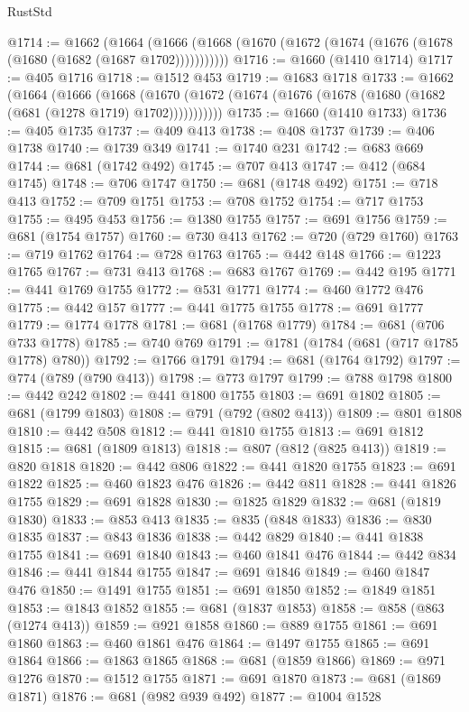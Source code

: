 \begin{lexlean}{RustStd}
\begin{coremodule}
@1714 := @1662
    (@1664 (@1666 (@1668 (@1670 (@1672 (@1674 (@1676 (@1678 (@1680 (@1682 (@1687 @1702)))))))))))
@1716 := @1660 (@1410 @1714)
@1717 := @405 @1716
@1718 := @1512 @453
@1719 := @1683 @1718
@1733 := @1662
    (@1664
      (@1666
        (@1668 (@1670 (@1672 (@1674 (@1676 (@1678 (@1680 (@1682 (@681 (@1278 @1719) @1702)))))))))))
@1735 := @1660 (@1410 @1733)
@1736 := @405 @1735
@1737 := @409 @413
@1738 := @408 @1737
@1739 := @406 @1738
@1740 := @1739 @349
@1741 := @1740 @231
@1742 := @683 @669
@1744 := @681 (@1742 @492)
@1745 := @707 @413
@1747 := @412 (@684 @1745)
@1748 := @706 @1747
@1750 := @681 (@1748 @492)
@1751 := @718 @413
@1752 := @709 @1751
@1753 := @708 @1752
@1754 := @717 @1753
@1755 := @495 @453
@1756 := @1380 @1755
@1757 := @691 @1756
@1759 := @681 (@1754 @1757)
@1760 := @730 @413
@1762 := @720 (@729 @1760)
@1763 := @719 @1762
@1764 := @728 @1763
@1765 := @442 @148
@1766 := @1223 @1765
@1767 := @731 @413
@1768 := @683 @1767
@1769 := @442 @195
@1771 := @441 @1769 @1755
@1772 := @531 @1771
@1774 := @460 @1772 @476
@1775 := @442 @157
@1777 := @441 @1775 @1755
@1778 := @691 @1777
@1779 := @1774 @1778
@1781 := @681 (@1768 @1779)
@1784 := @681 (@706 @733 @1778)
@1785 := @740 @769
@1791 := @1781 (@1784 (@681 (@717 @1785 @1778) @780))
@1792 := @1766 @1791
@1794 := @681 (@1764 @1792)
@1797 := @774 (@789 (@790 @413))
@1798 := @773 @1797
@1799 := @788 @1798
@1800 := @442 @242
@1802 := @441 @1800 @1755
@1803 := @691 @1802
@1805 := @681 (@1799 @1803)
@1808 := @791 (@792 (@802 @413))
@1809 := @801 @1808
@1810 := @442 @508
@1812 := @441 @1810 @1755
@1813 := @691 @1812
@1815 := @681 (@1809 @1813)
@1818 := @807 (@812 (@825 @413))
@1819 := @820 @1818
@1820 := @442 @806
@1822 := @441 @1820 @1755
@1823 := @691 @1822
@1825 := @460 @1823 @476
@1826 := @442 @811
@1828 := @441 @1826 @1755
@1829 := @691 @1828
@1830 := @1825 @1829
@1832 := @681 (@1819 @1830)
@1833 := @853 @413
@1835 := @835 (@848 @1833)
@1836 := @830 @1835
@1837 := @843 @1836
@1838 := @442 @829
@1840 := @441 @1838 @1755
@1841 := @691 @1840
@1843 := @460 @1841 @476
@1844 := @442 @834
@1846 := @441 @1844 @1755
@1847 := @691 @1846
@1849 := @460 @1847 @476
@1850 := @1491 @1755
@1851 := @691 @1850
@1852 := @1849 @1851
@1853 := @1843 @1852
@1855 := @681 (@1837 @1853)
@1858 := @858 (@863 (@1274 @413))
@1859 := @921 @1858
@1860 := @889 @1755
@1861 := @691 @1860
@1863 := @460 @1861 @476
@1864 := @1497 @1755
@1865 := @691 @1864
@1866 := @1863 @1865
@1868 := @681 (@1859 @1866)
@1869 := @971 @1276
@1870 := @1512 @1755
@1871 := @691 @1870
@1873 := @681 (@1869 @1871)
@1876 := @681 (@982 @939 @492)
@1877 := @1004 @1528

\end{coremodule}
\end{lexlean}
